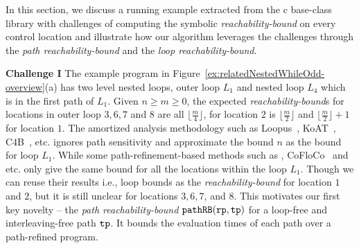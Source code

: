 In this section, we discuss a running example extracted from the c base-class library with
challenges of computing the symbolic
\emph{reachability-bound} on
every control location and illustrate how our algorithm leverages the challenges through the \emph{path reachability-bound} and the \emph{loop reachability-bound}.


\textbf{Challenge I}
The example program in Figure~\ref{ex:relatedNestedWhileOdd-overview}(a) has two level nested loops, outer loop $L_1$ and nested loop $L_4$ which is in the first path of $L_1$. Given $n \geq m \geq 0$,
the expected \emph{reachability-bound}s for locations in outer loop $3, 6, 7$ and $8$ are all $\lfloor\frac{m}{4}\rfloor$,
for location $2$ is $\lfloor\frac{m}{2}\rfloor$ and $\lfloor\frac{m}{2}\rfloor + 1$ for location $1$.
The amortized analysis methodology such as Loopus~\cite{SinnZV17}, KoAT~\cite{BrockschmidtEFFG14,FalkeKS12,FalkeKS11}, C4B~\cite{CarbonneauxHS15}, etc. ignores path sensitivity and approximate the bound $n$ as the bound for loop $L_1$. 
While some path-refinement-based methods such as \cite{GulwaniZ10,GulwaniJK09}, CoFloCo~\cite{Montoya17,Flores-Montoya16,Flores-MontoyaH14} and etc. only give the same bound for all the locations within the loop $L_1$. 
Though we can reuse their results i.e., loop bounds as the \emph{reachability-bound} for location $1$ and $2$,
but it is still unclear for locations $3, 6, 7$, and $8$.
%
This motivates our first key novelty -- the \emph{path reachability-bound} $\mathtt{pathRB}(\mathtt{rp}, \mathtt{tp})$ for a loop-free and interleaving-free path $\mathtt{tp}$.
It bounds the evaluation times of each path over a path-refined program.

